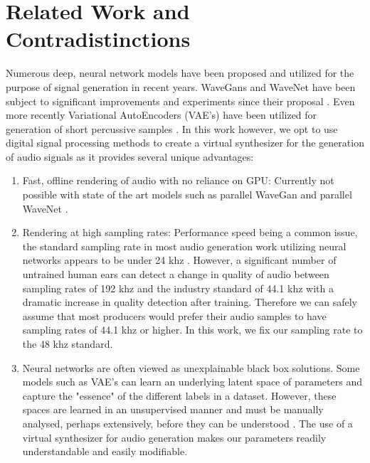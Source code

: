 \documentclass[\main/thesis.tex]{subfiles}
\begin{document}
\section{Related Work and Contradistinctions}
\label{related}
Numerous deep, neural network models have been proposed and utilized for the purpose of signal generation in recent years. WaveGans and WaveNet have been subject to significant improvements and experiments since their proposal \cite{nsynth2017,yamamoto2019parallel,oord2017parallel}. Even more recently Variational AutoEncoders (VAE's) have been utilized for generation of short percussive samples \cite{aouameur2019neural,ramires2019timbfeat}. In this work however, we opt to use digital signal processing methods to create a virtual synthesizer for the generation of audio signals as it provides several unique advantages:
\begin{enumerate}[label=\roman*]
  \item Fast, offline rendering of audio with no reliance on GPU: Currently not possible with state of the art models such as parallel WaveGan \cite{yamamoto2019parallel} and parallel WaveNet \cite{oord2017parallel}. 
  \item Rendering at high sampling rates: Performance speed being a common issue, the standard sampling rate in most audio generation work utilizing neural networks appears to be under 24 khz \cite{yamamoto2019parallel,oord2017parallel,aouameur2019neural,ramires2019timbfeat}. However, a significant number of untrained human ears can detect a change in quality of audio between sampling rates of 192 khz and the industry standard of 44.1 khz \cite{reiss2016meta} with a dramatic increase in quality detection after training. Therefore we can safely assume that most producers would prefer their audio samples to have sampling rates of 44.1 khz or higher. In this work, we fix our sampling rate to the 48 khz standard. 
  \item Neural networks are often viewed as unexplainable black box solutions. Some models such as VAE's can learn an underlying latent space of parameters and capture the "essence" of the different labels in a dataset. However, these spaces are learned in an unsupervised manner and must be manually analysed, perhaps extensively, before they can be understood \cite{esling2018generative}. The use of a virtual synthesizer for audio generation makes our parameters readily understandable and easily modifiable. \\
\end{enumerate}
\end{document}
